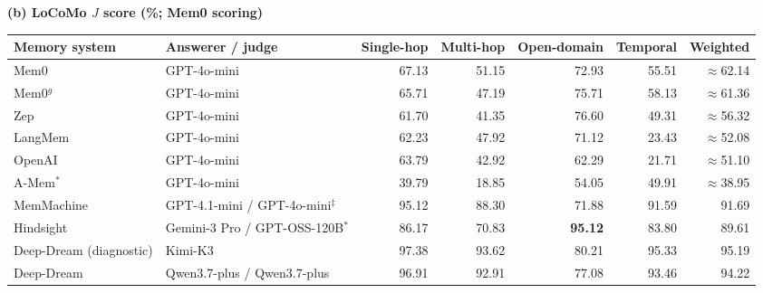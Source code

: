 \begin{table}[t]
\vspace{3pt}
{\footnotesize\textbf{(b) LoCoMo $J$ score (\%; Mem0 scoring)}}\\[1.5pt]
\begin{tabular*}{\textwidth}{@{\extracolsep{\fill}}>{\raggedright\arraybackslash}p{}>{\raggedright\arraybackslash}p{}rrrrr@{}}
\toprule
Memory system & Answerer / judge & Single-hop & Multi-hop & Open-domain & Temporal & Weighted \\
\midrule
Mem0 & GPT-4o-mini & 67.13 & 51.15 & 72.93 & 55.51 & $\approx$62.14 \\
Mem0$^g$ & GPT-4o-mini & 65.71 & 47.19 & 75.71 & 58.13 & $\approx$61.36 \\
Zep & GPT-4o-mini & 61.70 & 41.35 & 76.60 & 49.31 & $\approx$56.32 \\
LangMem & GPT-4o-mini & 62.23 & 47.92 & 71.12 & 23.43 & $\approx$52.08 \\
OpenAI & GPT-4o-mini & 63.79 & 42.92 & 62.29 & 21.71 & $\approx$51.10 \\
A-Mem$^*$ & GPT-4o-mini & 39.79 & 18.85 & 54.05 & 49.91 & $\approx$38.95 \\
\midrule
\rowcolor{green!9}
MemMachine & GPT-4.1-mini / GPT-4o-mini$^\ddagger$ & 95.12 & 88.30 & 71.88 & 91.59 & 91.69 \\
\rowcolor{green!9}
Hindsight & Gemini-3 Pro / GPT-OSS-120B$^\ast$ & 86.17 & 70.83 & \textbf{95.12} & 83.80 & 89.61 \\
\midrule
\rowcolor{blue!9}
Deep-Dream (diagnostic) & Kimi-K3 & 97.38 & 93.62 & 80.21 & 95.33 & 95.19 \\
\rowcolor{blue!9}
Deep-Dream & Qwen3.7-plus / Qwen3.7-plus & 96.91 & 92.91 & 77.08 & 93.46 & 94.22 \\
\bottomrule
\end{tabular*}


\end{table}
